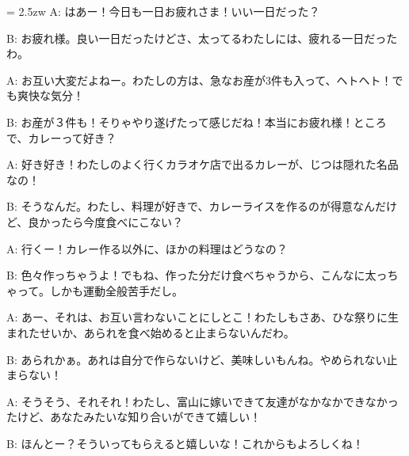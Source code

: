 \documentclass[11pt]{amsart}
\title{}
\author{}
\newenvironment{hangall}[1]{\hangindent = 2.5zw\everypar{\hangindent = 2.5zw}}{}
\begin{document}
\maketitle
\begin{hangall}{}%
A: はあー！今日も一日お疲れさま！いい一日だった？

B: お疲れ様。良い一日だったけどさ、太ってるわたしには、疲れる一日だったわ。

A: お互い大変だよねー。わたしの方は、急なお産が3件も入って、ヘトヘト！でも爽快な気分！

B: お産が３件も！そりゃやり遂げたって感じだね！本当にお疲れ様！ところで、カレーって好き？

A: 好き好き！わたしのよく行くカラオケ店で出るカレーが、じつは隠れた名品なの！

B: そうなんだ。わたし、料理が好きで、カレーライスを作るのが得意なんだけど、良かったら今度食べにこない？

A: 行くー！カレー作る以外に、ほかの料理はどうなの？

B: 色々作っちゃうよ！でもね、作った分だけ食べちゃうから、こんなに太っちゃって。しかも運動全般苦手だし。

A: あー、それは、お互い言わないことにしとこ！わたしもさあ、ひな祭りに生まれたせいか、あられを食べ始めると止まらないんだわ。

B: あられかぁ。あれは自分で作らないけど、美味しいもんね。やめられない止まらない！

A: そうそう、それそれ！わたし、富山に嫁いできて友達がなかなかできなかったけど、あなたみたいな知り合いができて嬉しい！

B: ほんとー？そういってもらえると嬉しいな！これからもよろしくね！
\end{hangall}
\end{document}
